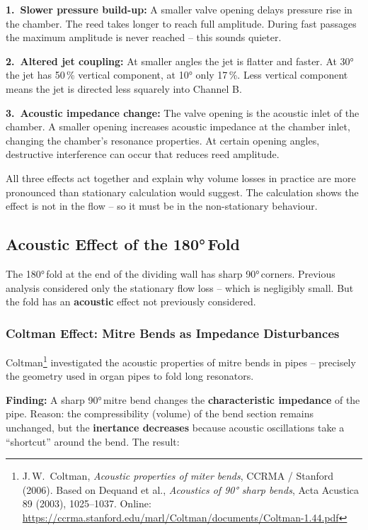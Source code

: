 \documentclass[11pt,a4paper]{article}
\begin{document}
\textbf{1.\ Slower pressure build-up:} A smaller valve opening delays pressure rise in the chamber. The reed takes longer to reach full amplitude. During fast passages the maximum amplitude is never reached -- this sounds quieter.

\textbf{2.\ Altered jet coupling:} At smaller angles the jet is flatter and faster. At 30° the jet has 50\,\% vertical component, at 10° only 17\,\%. Less vertical component means the jet is directed less squarely into Channel B.

\textbf{3.\ Acoustic impedance change:} The valve opening is the acoustic inlet of the chamber. A smaller opening increases acoustic impedance at the chamber inlet, changing the chamber's resonance properties. At certain opening angles, destructive interference can occur that reduces reed amplitude.

\begin{keybox}
All three effects act together and explain why volume losses in practice are more pronounced than stationary calculation would suggest. The calculation shows the effect is not in the flow -- so it must be in the non-stationary behaviour.
\end{keybox}

\subsection{Acoustic Effect of the 180°\,Fold}

The 180°\,fold at the end of the dividing wall has sharp 90°\,corners. Previous analysis considered only the stationary flow loss -- which is negligibly small. But the fold has an \textbf{acoustic} effect not previously considered.

\subsubsection{Coltman Effect: Mitre Bends as Impedance Disturbances}

Coltman\footnote{J.\,W.\ Coltman, \textit{Acoustic properties of miter bends}, CCRMA / Stanford (2006). Based on Dequand et al., \textit{Acoustics of 90° sharp bends}, Acta Acustica 89 (2003), 1025--1037. Online: \url{https://ccrma.stanford.edu/marl/Coltman/documents/Coltman-1.44.pdf}} investigated the acoustic properties of mitre bends in pipes -- precisely the geometry used in organ pipes to fold long resonators.

\textbf{Finding:} A sharp 90°\,mitre bend changes the \textbf{characteristic impedance} of the pipe. Reason: the compressibility (volume) of the bend section remains unchanged, but the \textbf{inertance decreases} because acoustic oscillations take a ``shortcut'' around the bend. The result:
\end{document}
